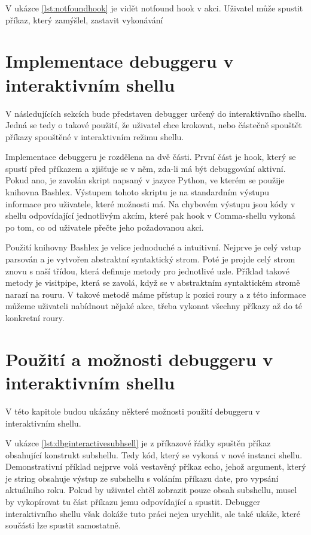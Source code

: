 \documentclass[thesis=M,czech]{FITthesis}[2012/06/26]
\begin{document}
V ukázce \ref{lst:notfoundhook} je vidět notfound hook v akci. Uživatel může spustit příkaz, který zamýšlel, zastavit vykonávání

%
%
%
%
%
\section{Implementace debuggeru v interaktivním shellu}

V následujících sekcích bude představen debugger určený do interaktivního shellu. Jedná se tedy o takové použití, že uživatel chce krokovat, nebo částečně spouštět příkazy spouštěné v interaktivním režimu shellu.

Implementace debuggeru je rozdělena na dvě části. První část je hook, který se spustí před příkazem a zjišťuje se v něm, zda-li má být debuggování aktivní. Pokud ano, je zavolán skript napsaný v jazyce Python, ve kterém se použije knihovna Bashlex. Výstupem tohoto skriptu je na standardním výstupu informace pro uživatele, které možnosti má. Na chybovém výstupu jsou kódy v shellu odpovídající jednotlivým akcím, které pak hook v Comma-shellu vykoná po tom, co od uživatele přečte jeho požadovanou akci.

Použití knihovny Bashlex je velice jednoduché a intuitivní. Nejprve je celý vstup parsován a je vytvořen abstraktní syntaktický strom. Poté je projde celý strom znovu s naší třídou, která definuje metody pro jednotlivé uzle. Příklad takové metody je visitpipe, která se zavolá, když se v abstraktním syntaktickém stromě narazí na rouru. V takové metodě máme přístup k pozici roury a z této informace můžeme uživateli nabídnout nějaké akce, třeba vykonat všechny příkazy až do té konkretní roury.


\section{Použití a možnosti debuggeru v interaktivním shellu}

V této kapitole budou ukázány některé možnosti použití debuggeru v interaktivním shellu.

V ukázce \ref{lst:dbginteractivesubhsell} je z příkazové řádky spuštěn příkaz obsahující konstrukt subshellu. Tedy kód, který se vykoná v nové instanci shellu. Demonstrativní příklad nejprve volá vestavěný příkaz echo, jehož argument, který je string obsahuje výstup ze subshellu s voláním příkazu date, pro vypsání aktuálního roku. Pokud by uživatel chtěl zobrazit pouze obsah subshellu, musel by vykopírovat tu část příkazu jemu odpovídající a spustit. Debugger interaktivního shellu však dokáže tuto práci nejen urychlit, ale také ukáže, které součásti lze spustit samostatně.
\end{document}
